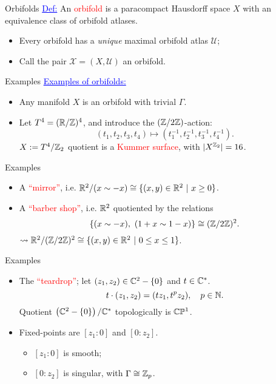 \begin{frame}{Orbifolds}
    \textcolor{blue}{\underline{Def:}} An \textcolor{red}{orbifold} is a paracompact Hausdorff space $X$ with an equivalence class of orbifold atlases.
    \begin{itemize}
        \item Every orbifold has a \emph{unique} maximal orbifold atlas $\mathcal{U}$;
        \item Call the pair $\mathcal{X} = (X, \mathcal{U})$ an orbifold.
    \end{itemize}
\end{frame}

\begin{frame}{Examples}
    \textcolor{blue}{\underline{Examples of orbifolds:}}
    \begin{itemize}
        \item Any manifold $X$ is an orbifold with trivial $\Gamma$.
        \item Let $T^{4} = (\mathbb{R}/\mathbb{Z})^{4}$, and introduce the $(\mathbb{Z}/2\mathbb{Z})$-action:
        \[
            (t_{1}, t_{2}, t_{3}, t_{4}) \mapsto (t_{1}^{-1}, t_{2}^{-1}, t_{3}^{-1}, t_{4}^{-1}).
        \]
        $X := T^{4}/\mathbb{Z}_{2}$ quotient is a \textcolor{red}{Kummer surface}, with $|X^{\mathbb{Z}_{2}}| = 16$.
    \end{itemize}
\end{frame}

\begin{frame}{Examples}
    \begin{itemize}
        \item A \textcolor{red}{``mirror''}, i.e. $\mathbb{R}^{2}/(x \sim -x) \cong \{(x,y) \in \mathbb{R}^{2}\ |\ x \geq 0\}$.
        \item A \textcolor{red}{``barber shop''}, i.e. $\mathbb{R}^{2}$ quotiented by the relations
        \[
            \{(x \sim -x),\ (1 + x \sim 1 - x)\} \cong (\mathbb{Z}/2\mathbb{Z})^{2}.
        \]
        $\rightsquigarrow \mathbb{R}^{2} / (\mathbb{Z}/2\mathbb{Z})^{2} \cong \{(x,y) \in \mathbb{R}^{2}\ |\ 0 \leq x \leq 1 \}$.
    \end{itemize}
\end{frame}

\begin{frame}{Examples}
    \begin{itemize}
        \item The \textcolor{red}{``teardrop''}; let $(z_{1}, z_{2}) \in \mathbb{C}^{2} - \{0\}$ and $t \in \mathbb{C}^{\ast}$.
        \[
            t \cdot (z_{1}, z_{2}) = (tz_{1}, t^{p}z_{2}), \quad p \in \mathbb{N}.
        \]
        Quotient $\left(\mathbb{C}^{2} - \{0\}\right)/\mathbb{C}^{\ast}$ topologically is $\mathbb{C}\mathbb{P}^{1}$.\\
                
        \item Fixed-points are $[z_{1}:0]$ and $[0:z_{2}]$.
        \begin{itemize}
            \item $[z_{1}:0]$ is smooth;
            \item $[0:z_{2}]$ is singular, with $\Gamma \cong \mathbb{Z}_{p}$.
        \end{itemize}
    \end{itemize}
\end{frame}

